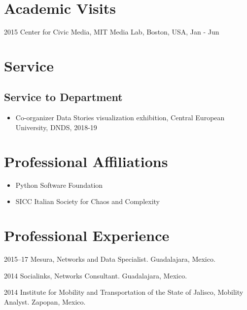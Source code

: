 \documentclass{academiccv}
\begin{document}
\section*{Academic Visits}

\begin{tablist}
	
	\item[2015] 	\tab Center for Civic Media, MIT Media Lab, Boston, USA, Jan - Jun
		
\end{tablist}


\section*{Service}
\subsection*{Service to Department}
\begin{itemize}
	\item Co-organizer Data Stories visualization exhibition, Central European University, DNDS, 2018-19
\end{itemize}


\section*{Professional Affiliations}
\begin{itemize}
	\item Python Software Foundation
	\item SICC Italian Society for Chaos and Complexity
\end{itemize}



\section*{Professional Experience}

\begin{tablist}
	
\item[2015--17] \tab Mesura, Networks and Data Specialist. Guadalajara, Mexico.

\item[2014] \tab Socialinks, Networks Consultant. Guadalajara, Mexico.

\item[2014] \tab Institute for Mobility and Transportation of the State of Jalisco, Mobility Analyst. Zapopan, Mexico.

\end{tablist}
\end{document}
